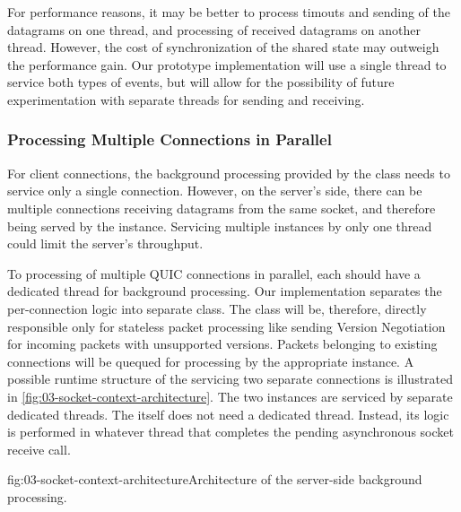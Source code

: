 For performance reasons, it may be better to process timouts and sending of the datagrams on one
thread, and processing of received datagrams on another thread. However, the cost of synchronization
of the shared state may outweigh the performance gain. Our prototype implementation will use a
single thread to service both types of events, but will allow for the possibility of future
experimentation with separate threads for sending and receiving.

\subsubsection{Processing Multiple Connections in Parallel}

For client connections, the background processing provided by the \QuicSocketContext{} class needs
to service only a single connection. However, on the server's side, there can be multiple
connections receiving datagrams from the same socket, and therefore being served by the
\QuicSocketContext{} instance. Servicing multiple \QuicConnection{} instances by only one thread
could limit the server's throughput.

To processing of multiple QUIC connections in parallel, each \QuicConnection{} should
have a dedicated thread for background processing. Our implementation separates the per-connection
logic into separate \QuicConnectionContext{} class. The \QuicSocketContext{} class will be,
therefore, directly responsible only for stateless packet processing like sending Version
Negotiation for incoming packets with unsupported versions. Packets belonging to existing
connections will be quequed for processing by the appropriate \QuicConnectionContext{} instance. A
possible runtime structure of the \QuicSocketContext{} servicing two separate connections is
illustrated in \autoref{fig:03-socket-context-architecture}. The two \QuicConnectionContext{}
instances are serviced by separate dedicated threads. The \QuicSocketContext{} itself does not need
a dedicated thread. Instead, its logic is performed in whatever thread that completes the pending
asynchronous socket receive call.

\begin{myFigure}{fig:03-socket-context-architecture}{Architecture of the server-side background processing.}

\resizebox{\linewidth}{!}{}

\end{myFigure}

